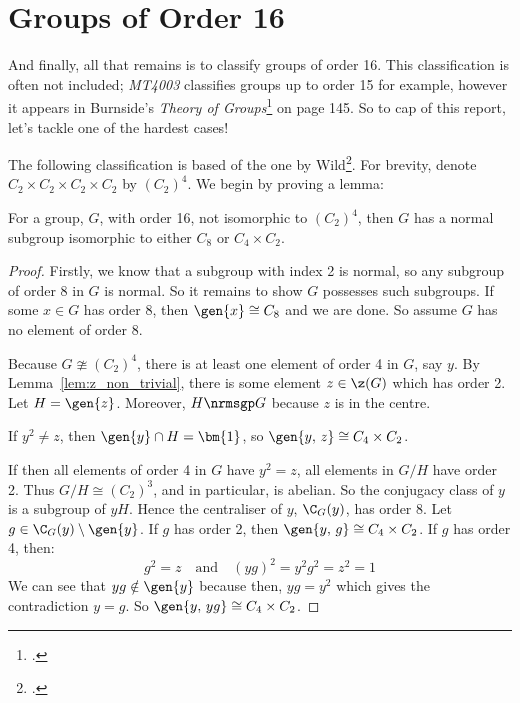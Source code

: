\section{Groups of Order 16}
And finally, all that remains is to classify groups of order 16.
This classification is often not included; \textit{MT4003} classifies groups up to order 15 for example, however it
appears in Burnside's \textit{Theory of Groups}\footcite[p145]{burnside1911} on page 145.
So to cap of this report, let's tackle one of the hardest cases!

The following classification is based of the one by Wild\footcite{order16}.
For brevity, denote \(C_2 {\times} C_2 {\times} C_2 {\times} C_2\) by \({(C_2)}^4\).
We begin by proving a lemma:

\begin{lemma}\label{lem:order_16_subgp}
    \raggedright
    For a group, \(G\), with order 16, not isomorphic to \({(C_2)}^4\), then \(G\) has a
    normal subgroup isomorphic to either \(C_8\) or \(C_4 \times C_2\).
\end{lemma}

\begin{proof}
    Firstly, we know that a subgroup with index 2 is normal, so any subgroup of order 8 in \(G\) is normal.
    So it remains to show \(G\) possesses such subgroups.
    If some \(x \in G\) has order 8, then \(\gen{x} \cong C_8\) and we are done.
    So assume \(G\) has no element of order 8.

    Because \(G \ncong {(C_2)}^4\), there is at least one element of order 4 in \(G\), say \(y\).
    By Lemma~\ref{lem:z_non_trivial}, there is some element \(z \in \z(G)\) which has order 2.
    Let \(H = \gen{z}\).
    Moreover, \(H \nrmsgp G\) because \(z\) is in the centre.

    If \(y^2 \neq z\), then \(\gen{y} \cap H = \bm{1}\), so \(\gen{y,\,z} \cong C_4 \times C_2\).

    If then all elements of order 4 in \(G\) have \(y^2 = z\), all elements in \(G/H\) have order 2.
    Thus \(G/H \cong {(C_2)}^3\), and in particular, is abelian.
    So the conjugacy class of \(y\) is a subgroup of \(yH\).
    Hence the centraliser of \(y\), \(\C_G(y)\), has order 8.
    Let \(g \in \C_G(y) \setminus \gen{y}\).
    If \(g\) has order 2, then \(\gen{y,\,g} \cong C_4 \times C_2\).
    If \(g\) has order 4, then:
    \[g^2 = z \quad \text{and} \quad {(yg)}^2 = y^2 g^2 = z^2 = 1\]
    We can see that \(yg \notin \gen{y}\) because then, \(yg = y^2\) which gives the contradiction \(y = g\).
    So \(\gen{y,\,yg} \cong C_4 \times C_2\).
\end{proof}

